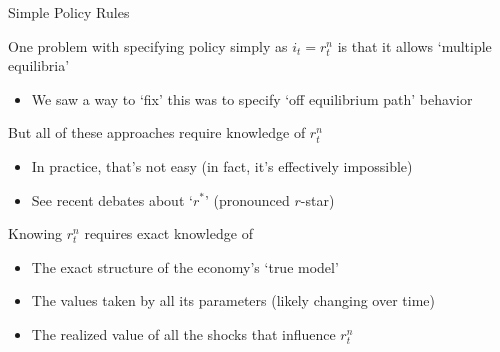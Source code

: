 
	
\begin{frame}{Simple Policy Rules}

One problem with specifying policy simply as $i_{t}=r^{n}_{t}$ is that it allows `multiple equilibria'
\begin{itemize}
\item	We saw a way to `fix' this was to specify `off equilibrium path' behavior
\end{itemize}
\vspace{2mm}	
But all of these approaches require knowledge of $r^{n}_{t}$
\begin{itemize}
\item	In practice, that's not easy (in fact, it's effectively impossible)
\item	See recent debates about `$r^{\ast}$' (pronounced $r$-star)
\end{itemize}
\vspace{2mm}	
Knowing $r^{n}_{t}$ requires exact knowledge of
\begin{itemize}
\item	The exact structure of the economy's `true model'
\item	The values taken by all its parameters (likely changing over time)
\item	The realized value of all the shocks that influence $r^{n}_{t}$
\end{itemize}

\end{frame}


	
